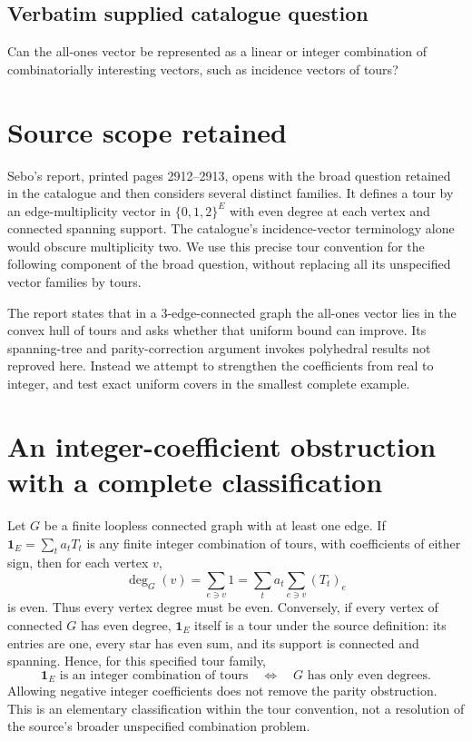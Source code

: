 \documentclass[11pt]{article}
\begin{document}
\subsection{Verbatim supplied catalogue question}
Can the all-ones vector be represented as a linear or integer combination of combinatorially interesting vectors, such as incidence vectors of tours?

\section{Source scope retained}
Sebo's report, printed pages 2912--2913, opens with the broad question retained
in the catalogue and then considers several distinct families. It defines a
tour by an edge-multiplicity vector in $\{0,1,2\}^E$ with even degree at each
vertex and connected spanning support. The catalogue's incidence-vector
terminology alone would obscure multiplicity two. We use this precise tour
convention for the following component of the broad question, without
replacing all its unspecified vector families by tours.

The report states that in a 3-edge-connected graph the all-ones vector lies
in the convex hull of tours and asks whether that uniform bound can improve.
Its spanning-tree and parity-correction argument invokes polyhedral results
not reproved here. Instead we attempt to strengthen the coefficients from
real to integer, and test exact uniform covers in the smallest complete example.

\section{An integer-coefficient obstruction with a complete classification}
Let $G$ be a finite loopless connected graph with at least one edge. If
$\mathbf1_E=\sum_t a_t T_t$ is any finite integer combination of tours,
with coefficients of either sign, then for each vertex $v$,
\[
\deg_G(v)=\sum_{e\ni v}1=\sum_t a_t\sum_{e\ni v}(T_t)_e
\]
is even. Thus every vertex degree must be even. Conversely, if every vertex
of connected $G$ has even degree, $\mathbf1_E$ itself is a tour under the
source definition: its entries are one, every star has even sum, and its
support is connected and spanning. Hence, for this specified tour family,
\[
\mathbf1_E\text{ is an integer combination of tours}
\quad\Longleftrightarrow\quad G\text{ has only even degrees}.
\]
Allowing negative integer coefficients does not remove the parity obstruction.
This is an elementary classification within the tour convention, not a
resolution of the source's broader unspecified combination problem.
\end{document}

